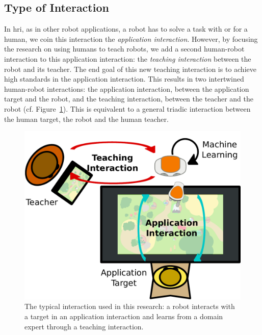 \subsection{Type of Interaction}

In \gls{hri}, as in other robot applications, a robot has to solve a task with or for a human, we coin this interaction the \emph{application interaction}. However, by focusing the research on using humans to teach robots, we add a second human-robot interaction to this application interaction: the \emph{teaching interaction} between the robot and its teacher. The end goal of this new teaching interaction is to achieve high standards in the application interaction. This results in two intertwined human-robot interactions: the application interaction, between the application target and the robot, and the teaching interaction, between the teacher and the robot (cf. Figure~\ref{fig:intro_setup}). This is equivalent to a general triadic interaction between the human target, the robot and the human teacher.

\begin{figure}[ht]
	\includegraphics[width=.7\linewidth]{setup.pdf}
	\centering
	\caption{The typical interaction used in this research: a robot interacts with a target in an application interaction and learns from a domain expert through a teaching interaction.}
	\label{fig:intro_setup}
\end{figure}

